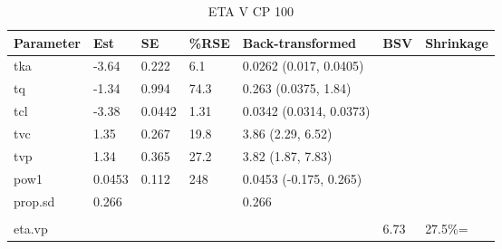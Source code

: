 \begin{table}
\centering\centering
\caption{ETA V CP 100}
\centering
\fontsize{8}{10}\selectfont
\begin{tabular}[t]{lllllll}
\toprule
\textbf{Parameter} & \textbf{Est} & \textbf{SE} & \textbf{\%RSE} & \textbf{Back-transformed} & \textbf{BSV} & \textbf{Shrinkage}\\
\midrule
tka & -3.64 & 0.222 & 6.1 & 0.0262 (0.017, 0.0405) &  & \\
\midrule
tq & -1.34 & 0.994 & 74.3 & 0.263 (0.0375, 1.84) &  & \\
\midrule
tcl & -3.38 & 0.0442 & 1.31 & 0.0342 (0.0314, 0.0373) &  & \\
\midrule
tvc & 1.35 & 0.267 & 19.8 & 3.86 (2.29, 6.52) &  & \\
\midrule
tvp & 1.34 & 0.365 & 27.2 & 3.82 (1.87, 7.83) &  & \\
\midrule
pow1 & 0.0453 & 0.112 & 248 & 0.0453 (-0.175, 0.265) &  & \\
\midrule
prop.sd & 0.266 &  &  & 0.266 &  & \\
\midrule\\
eta.vp &  &  &  &  & 6.73 & 27.5\%=\\
\bottomrule
\end{tabular}
\end{table}